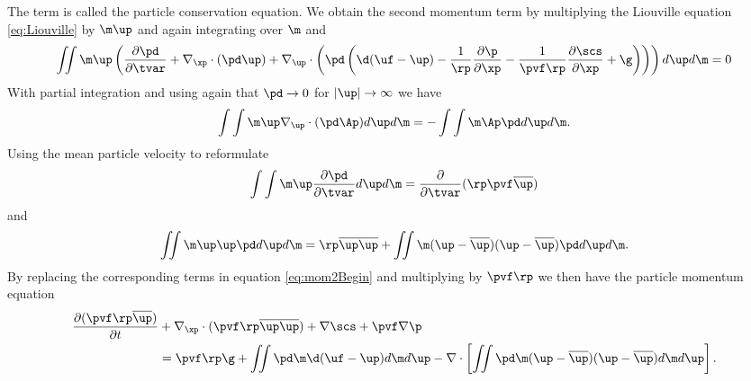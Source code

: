The term is called the particle conservation equation.
We obtain the second momentum term by multiplying the Liouville equation \eqref{eq:Liouville} by $\m \up$ and again integrating over $\m$ and \up
\begin{equation}
\label{eq:mom2Begin}
    \MultiIntegral{2} \m \up \left( \dfrac{\partial \pd}{\partial \tvar} + \nabla_{\xp} \cdot (\pd \up) + \nabla_{\up} \cdot \left(\pd
    \left(\d(\uf - \up) - \dfrac{1}{\rp} \dfrac{\partial \p}{\partial \xp} - \dfrac{1}{\pvf \rp} \dfrac{\partial \scs}{\partial \xp} + \g \right)
    \right)\right) d \up d \m = 0
\end{equation}
With partial integration and using again that $\pd \to 0$ for $\lvert \up \rvert \to \infty$ we have
\begin{equation*}
    \int \int \m \up \nabla_{\up} \cdot (\pd \Ap ) d \up d \m = - \int \int \m \Ap \pd d \up d \m.
\end{equation*}
Using the mean particle velocity to reformulate
\begin{equation*}
    \int \int \m \up \dfrac{\partial \pd}{\partial \tvar} d \up d \m = \dfrac{\partial}{\partial \tvar} (\rp \pvf \overline{\up} )
\end{equation*}
and
\begin{equation*}
    \MultiIntegral{2} \m \up \up \pd d \up d \m = \rp \overline{\up} \overline{\up} + \MultiIntegral{2} \m (\up - \overline{\up}) ( \up - \overline{\up}) \pd d \up d \m.
\end{equation*}
By replacing the corresponding terms in equation \eqref{eq:mom2Begin} and multiplying by $\pvf \rp$ we then have the particle momentum equation
\begin{equation}
    \begin{aligned}
\label{eq:secondMomentum}
    \dfrac{\partial ( \pvf \rp \overline{\up})}{\partial t} &+ \nabla_{\xp} \cdot (\pvf \rp \overline{\up} \overline{\up} ) + \nabla \scs + \pvf \nabla \p \\ &= \pvf \rp \g + \MultiIntegral{2} \pd \m \d (\uf - \up) d \m d\up - \nabla \cdot \left[ \MultiIntegral{2} \pd \m (\up - \overline{\up}) (\up - \overline{\up}) d \m d \up \right].
    \end{aligned}
\end{equation}

